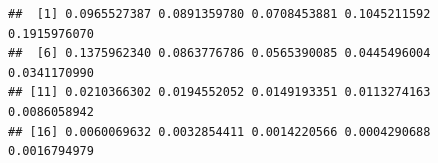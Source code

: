 \documentclass[
]{book}
\newenvironment{Shaded}{\begin{snugshade}}{\end{snugshade}}
\newcommand{\AttributeTok}[1]{\textcolor[rgb]{0.77,0.63,0.00}{#1}}
\newcommand{\CommentTok}[1]{\textcolor[rgb]{0.56,0.35,0.01}{\textit{#1}}}
\newcommand{\ConstantTok}[1]{\textcolor[rgb]{0.00,0.00,0.00}{#1}}
\newcommand{\FloatTok}[1]{\textcolor[rgb]{0.00,0.00,0.81}{#1}}
\newcommand{\FunctionTok}[1]{\textcolor[rgb]{0.00,0.00,0.00}{#1}}
\newcommand{\NormalTok}[1]{#1}
\newcommand{\OtherTok}[1]{\textcolor[rgb]{0.56,0.35,0.01}{#1}}
\newcommand{\SpecialCharTok}[1]{\textcolor[rgb]{0.00,0.00,0.00}{#1}}
\begin{document}
\begin{verbatim}
##  [1] 0.0965527387 0.0891359780 0.0708453881 0.1045211592 0.1915976070
##  [6] 0.1375962340 0.0863776786 0.0565390085 0.0445496004 0.0341170990
## [11] 0.0210366302 0.0194552052 0.0149193351 0.0113274163 0.0086058942
## [16] 0.0060069632 0.0032854411 0.0014220566 0.0004290688 0.0016794979
\end{verbatim}

\begin{Shaded}
\end{Shaded}
\end{document}
